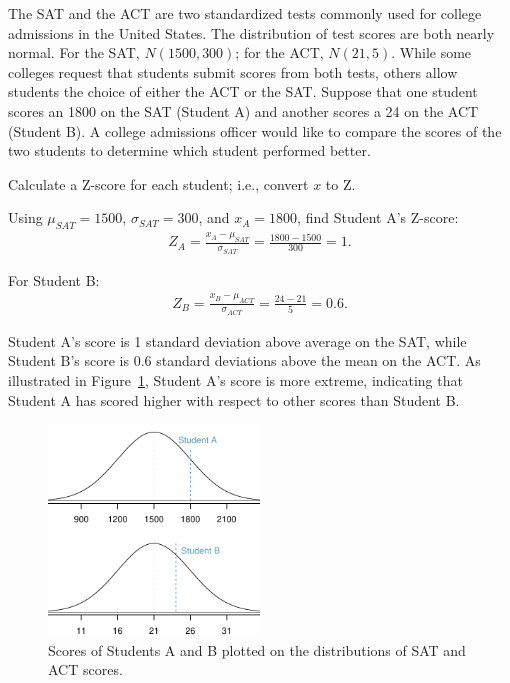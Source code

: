\begin{examplewrap}
\begin{nexample}{The SAT and the ACT are two standardized tests commonly used for college admissions in the United States. The distribution of test scores are both nearly normal. For the SAT, $N(1500, 300)$; for the ACT, $N(21, 5)$. While some colleges request that students submit scores from both tests, others allow students the choice of either the ACT or the SAT. Suppose that one student scores an 1800 on the SAT (Student A) and another scores a 24 on the ACT (Student B). A college admissions officer would like to compare the scores of the two students to determine which student performed better.}\label{actSAT}
		
Calculate a Z-score for each student; i.e., convert $x$ to Z.
		
Using $\mu_{SAT}=1500$, $\sigma_{SAT}=300$, and $x_{A}=1800$, find Student A's Z-score:
\begin{align*}
	Z_{A} = \frac{x_{A} - \mu_{SAT}}{\sigma_{SAT}} = \frac{1800-1500}{300} = 1.
\end{align*}

For Student B:
\begin{align*}
	Z_{B} = \frac{x_{B} - \mu_{ACT}}{\sigma_{ACT}} = \frac{24 - 21}{5} = 0.6.
\end{align*}

Student A's score is 1 standard deviation above average on the SAT, while Student B's score is 0.6 standard deviations above the mean on the ACT. As illustrated in Figure~\ref{satActNormals}, Student A's score is more extreme, indicating that Student A has scored higher with respect to other scores than Student B.
\end{nexample}
\end{examplewrap}

\begin{figure}[h]
\centering
\includegraphics[width=0.5\textwidth]{ch_distributions_oi_biostat/figures/satActNormals/satActNormals}
\caption{Scores of Students A and B plotted on the distributions of SAT and ACT scores.}
\label{satActNormals}
\end{figure}


